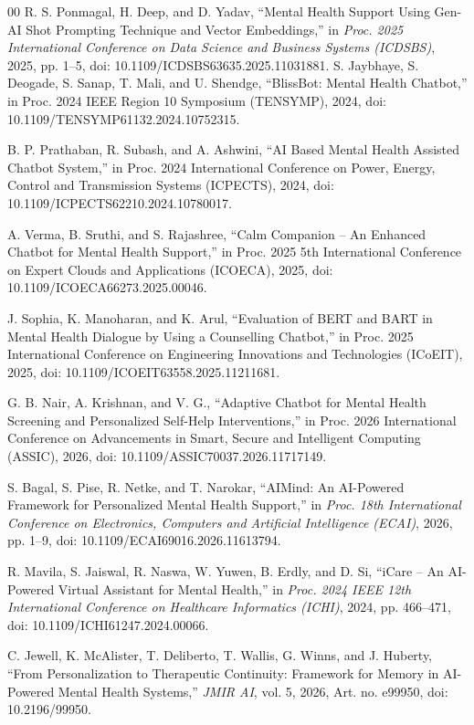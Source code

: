 \documentclass[conference]{IEEEtran}
\begin{document}
\begin{thebibliography}{00}
 R. S. Ponmagal, H. Deep, and D. Yadav, 
``Mental Health Support Using Gen-AI Shot Prompting Technique and Vector Embeddings,''
in \textit{Proc. 2025 International Conference on Data Science and Business Systems (ICDSBS)}, 2025, pp. 1--5, 
doi: 10.1109/ICDSBS63635.2025.11031881.
 S. Jaybhaye, S. Deogade, S. Sanap, T. Mali, and U. Shendge, ``BlissBot: Mental Health Chatbot,'' in Proc. 2024 IEEE Region 10 Symposium (TENSYMP), 2024, doi: 10.1109/TENSYMP61132.2024.10752315.

 B. P. Prathaban, R. Subash, and A. Ashwini, ``AI Based Mental Health Assisted Chatbot System,'' in Proc. 2024 International Conference on Power, Energy, Control and Transmission Systems (ICPECTS), 2024, doi: 10.1109/ICPECTS62210.2024.10780017.

 A. Verma, B. Sruthi, and S. Rajashree, ``Calm Companion -- An Enhanced Chatbot for Mental Health Support,'' in Proc. 2025 5th International Conference on Expert Clouds and Applications (ICOECA), 2025, doi: 10.1109/ICOECA66273.2025.00046.

 J. Sophia, K. Manoharan, and K. Arul, ``Evaluation of BERT and BART in Mental Health Dialogue by Using a Counselling Chatbot,'' in Proc. 2025 International Conference on Engineering Innovations and Technologies (ICoEIT), 2025, doi: 10.1109/ICOEIT63558.2025.11211681.

 G. B. Nair, A. Krishnan, and V. G., ``Adaptive Chatbot for Mental Health Screening and Personalized Self-Help Interventions,'' in Proc. 2026 International Conference on Advancements in Smart, Secure and Intelligent Computing (ASSIC), 2026, doi: 10.1109/ASSIC70037.2026.11717149.

S. Bagal, S. Pise, R. Netke, and T. Narokar,
``AIMind: An AI-Powered Framework for Personalized Mental Health Support,''
in \textit{Proc. 18th International Conference on Electronics, Computers and Artificial Intelligence (ECAI)}, 2026, pp. 1--9,
doi: 10.1109/ECAI69016.2026.11613794.

R. Mavila, S. Jaiswal, R. Naswa, W. Yuwen, B. Erdly, and D. Si,
``iCare -- An AI-Powered Virtual Assistant for Mental Health,''
in \textit{Proc. 2024 IEEE 12th International Conference on Healthcare Informatics (ICHI)}, 2024, pp. 466--471,
doi: 10.1109/ICHI61247.2024.00066.

C. Jewell, K. McAlister, T. Deliberto, T. Wallis, G. Winns, and J. Huberty,
``From Personalization to Therapeutic Continuity: Framework for Memory in AI-Powered Mental Health Systems,''
\textit{JMIR AI}, vol. 5, 2026, Art. no. e99950,
doi: 10.2196/99950.


\end{thebibliography}
\end{document}
